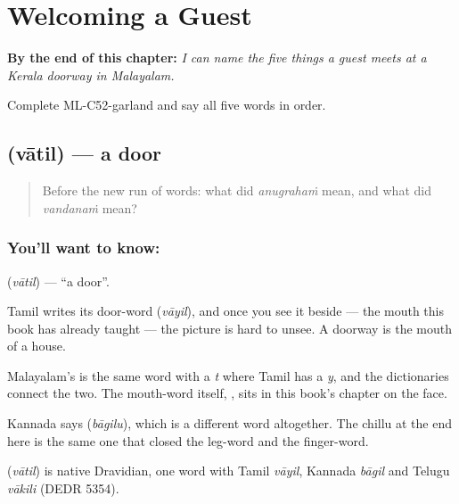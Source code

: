 
\chapter{Welcoming a Guest}
\label{ch:ml-welcoming-a-guest}

\begin{chapteropening}
\textbf{By the end of this chapter:} \emph{I can name the five things a guest meets at a Kerala doorway in Malayalam.}

Complete ML-C52-garland and say all five words in order.
\end{chapteropening}

\section[\texorpdfstring{\ml{വാതിൽ} (vātil)}{വാതിൽ (vātil)}]{ (vātil) — a door}

\label{lesson:ML-C52-door}



\begin{quote}
Before the new run of words: what did \emph{anugrahaṁ} mean, and what did \emph{vandanaṁ} mean?
\end{quote}

\subsection*{You'll want to know: }
\textbf{} (\emph{vātil}) — \textquotedblleft{}a door\textquotedblright{}.

Tamil writes its door-word  (\emph{vāyil}), and once you see it beside  — the mouth this book has already taught — the picture is hard to unsee. A doorway is the mouth of a house.

Malayalam's  is the same word with a \emph{t} where Tamil has a \emph{y}, and the dictionaries connect the two. The mouth-word itself, , sits in this book's chapter on the face.

Kannada says  (\emph{bāgilu}), which is a different word altogether. The chillu  at the end here is the same one that closed the leg-word and the finger-word.

\begin{cousinweb}
\textbf{} (\emph{vātil}) is native Dravidian, one word with Tamil \emph{vāyil}, Kannada \emph{bāgil} and Telugu \emph{vākili} (DEDR 5354).
\end{cousinweb}

